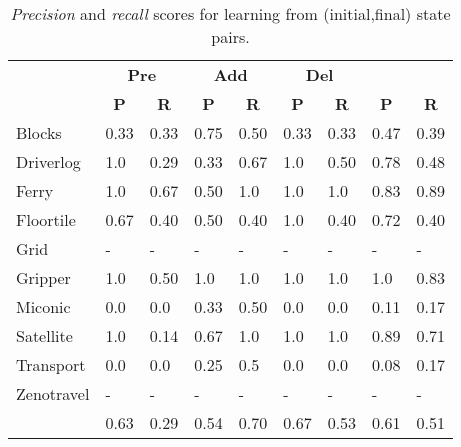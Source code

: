 \begin{table}
\begin{footnotesize}
	\begin{center}
		\begin{tabular}{l|l|l|l|l|l|l||l|l|}
			 & \multicolumn{2}{|c|}{\bf Pre} & \multicolumn{2}{|c|}{\bf Add} & \multicolumn{2}{|c||}{\bf Del} & \multicolumn{2}{|c}{\bf}\\ \cline{2-9}			
			  & \multicolumn{1}{|c|}{\bf P} & \multicolumn{1}{|c|}{\bf R} & \multicolumn{1}{|c|}{\bf P} & \multicolumn{1}{|c|}{\bf R} & \multicolumn{1}{|c|}{\bf P} & \multicolumn{1}{|c||}{\bf R} &  \multicolumn{1}{|c|}{\bf P} & \multicolumn{1}{|c|}{\bf R} \\
			\hline
            Blocks & 0.33 & 0.33 & 0.75 & 0.50 & 0.33 & 0.33 & 0.47 & 0.39 \\
            Driverlog & 1.0 & 0.29 & 0.33 & 0.67 & 1.0 & 0.50 & 0.78 & 0.48 \\
            Ferry & 1.0 & 0.67 & 0.50 & 1.0 & 1.0 & 1.0 & 0.83 & 0.89 \\
            Floortile & 0.67 & 0.40 & 0.50 & 0.40 & 1.0 & 0.40 & 0.72 & 0.40 \\
            Grid & - & - & - & - & - & - & - & - \\
            Gripper & 1.0 & 0.50 & 1.0 & 1.0 & 1.0 & 1.0 & 1.0 & 0.83 \\
            Miconic & 0.0 & 0.0 & 0.33 & 0.50 & 0.0 & 0.0 & 0.11 & 0.17 \\
            Satellite & 1.0 & 0.14 & 0.67 & 1.0 & 1.0 & 1.0 & 0.89 & 0.71 \\
            Transport & 0.0 & 0.0 & 0.25 & 0.5 & 0.0 & 0.0 & 0.08 & 0.17 \\
            Zenotravel & - & - & - & - & - & - & - & - \\
            \hline
            & 0.63 & 0.29 & 0.54 & 0.70 & 0.67 & 0.53 & 0.61 & 0.51 \\			
			\end{tabular}
	\end{center}
\end{footnotesize}
\caption{\small {\em Precision} and {\em recall} scores for learning from (initial,final) state pairs.}
\label{tab:results_states}
\end{table}

